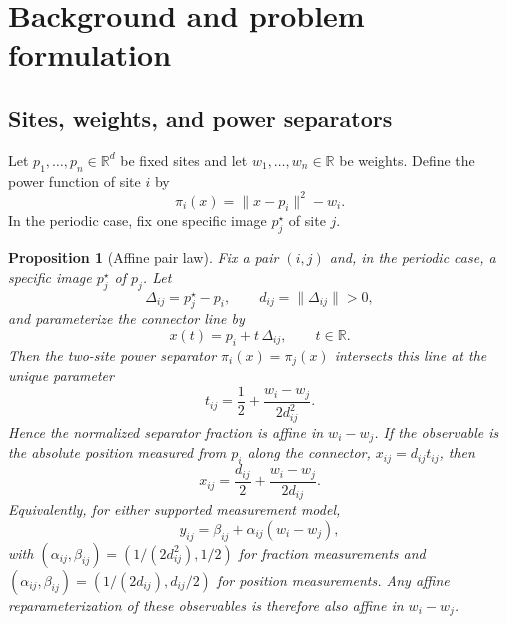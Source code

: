 \documentclass[preprint,12pt]{elsarticle}
\newtheorem{proposition}{Proposition}
\newcommand{\R}{\mathbb{R}}
\begin{document}
\section{Background and problem formulation}
\label{sec:background}

\subsection{Sites, weights, and power separators}
Let $p_1,\dots,p_n \in \R^d$ be fixed sites and let $w_1,\dots,w_n \in \R$ be
weights. Define the power function of site $i$ by
\begin{equation}
    \pi_i(x) = \lVert x-p_i \rVert^2 - w_i.
\end{equation}
In the periodic case, fix one specific image $p_j^{\star}$ of site $j$.

\begin{proposition}[Affine pair law]
\label{prop:affine}
Fix a pair $(i,j)$ and, in the periodic case, a specific image $p_j^{\star}$ of
$p_j$. Let
\begin{equation}
    \Delta_{ij} = p_j^{\star}-p_i,
    \qquad
    d_{ij} = \lVert \Delta_{ij} \rVert > 0,
\end{equation}
and parameterize the connector line by
\begin{equation}
    x(t) = p_i + t\,\Delta_{ij},
    \qquad t\in\R.
\end{equation}
Then the two-site power separator $\pi_i(x)=\pi_j(x)$ intersects this line at the
unique parameter
\begin{equation}
    t_{ij} = \frac12 + \frac{w_i-w_j}{2d_{ij}^2}.
\end{equation}
Hence the normalized separator fraction is affine in $w_i-w_j$. If the
observable is the absolute position measured from $p_i$ along the connector,
$x_{ij}=d_{ij}t_{ij}$, then
\begin{equation}
    x_{ij} = \frac{d_{ij}}{2} + \frac{w_i-w_j}{2d_{ij}}.
\end{equation}
Equivalently, for either supported measurement model,
\begin{equation}
    y_{ij}=\beta_{ij}+\alpha_{ij}(w_i-w_j),
\end{equation}
with $(\alpha_{ij},\beta_{ij})=(1/(2d_{ij}^2),1/2)$ for fraction measurements and
$(\alpha_{ij},\beta_{ij})=(1/(2d_{ij}),d_{ij}/2)$ for position measurements.
Any affine reparameterization of these observables is therefore also affine in
$w_i-w_j$.
\end{proposition}
\end{document}
